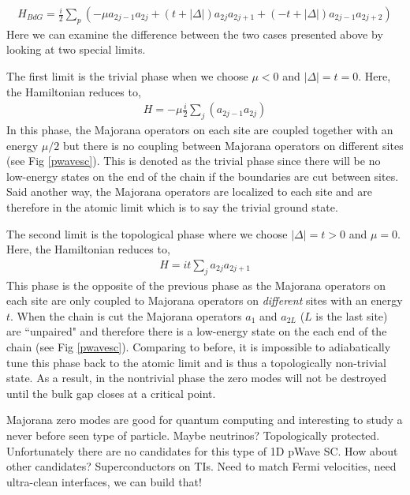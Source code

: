 \begin{align}
	H_{BdG} = \frac{i}{2}\sum_{p}\left(-\mu a_{2j-1}a_{2j}+(t+|\Delta|)a_{2j}a_{2j+1}+(-t+|\Delta|)a_{2j-1}a_{2j+2}\right)
\end{align}
Here we can examine the difference between the two cases presented above by looking at two special limits.\par 
The first limit is the trivial phase when we choose $\mu < 0$ and $|\Delta|=t=0$. Here, the Hamiltonian reduces to,
\begin{align}
	H = -\mu\frac{i}{2}\sum_{j}(a_{2j-1}a_{2j})
\end{align}
In this phase, the Majorana operators on each site are coupled together with an energy $\mu/2$ but there is no coupling between Majorana operators on different sites (see Fig \ref{pwavesc}). This is denoted as the trivial phase since there will be no low-energy states on the end of the chain if the boundaries are cut between sites. Said another way, the Majorana operators are localized to each site and are therefore in the atomic limit which is to say the trivial ground state.\par 
The second limit is the topological phase where we choose $|\Delta|=t>0$ and $\mu=0$. Here, the Hamiltonian reduces to,
\begin{align}
	H=it\sum_{j}a_{2j}a_{2j+1}
\end{align}
This phase is the opposite of the previous phase as the Majorana operators on each site are only coupled to Majorana operators on \textit{different} sites with an energy $t$. When the chain is cut the Majorana operators $a_{1}$ and $a_{2L}$ ($L$ is the last site) are ``unpaired" and therefore there is a low-energy state on the each end of the chain (see Fig \ref{pwavesc}). Comparing to before, it is impossible to adiabatically tune this phase back to the atomic limit and is thus a topologically non-trivial state. As a result, in the nontrivial phase the zero modes will not be destroyed until the bulk gap closes at a critical point.\par 
Majorana zero modes are good for quantum computing and interesting to study a never before seen type of particle. Maybe neutrinos? Topologically protected. Unfortunately there are no candidates for this type of 1D pWave SC. How about other candidates? Superconductors on TIs. Need to match Fermi velocities, need ultra-clean interfaces, we can build that!